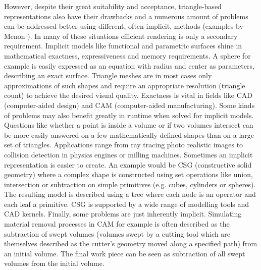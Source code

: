 However, despite their great suitability and acceptance, triangle-based representations also have their drawbacks and a numerous amount of problems can be addressed better using different, often implicit, methods (\cf examples by Menon \cite{implicit_techniques}). %
In many of these situations efficient rendering is only a secondary requirement.
Implicit models like functional and parametric surfaces shine in mathematical exactness, expressiveness and memory requirements.
A sphere for example is easily expressed as an equation with radius and center as parameters, describing an exact surface.
Triangle meshes are in most cases only approximations of such shapes and require an appropriate resolution (\ie triangle count) to achieve the desired visual quality.
Exactness is vital in fields like CAD (computer-aided design) and CAM (computer-aided manufacturing).
%
Some kinds of problems may also benefit greatly in runtime when solved for implicit models.
Questions like whether a point is inside a volume or if two volumes intersect can be more easily answered on a few mathematically defined shapes than on a large set of triangles.
Applications range from ray tracing photo realistic images to collision detection in physics engines or milling machines.
%
Sometimes an implicit representation is easier to create.
An example would be CSG (constructive solid geometry) where a complex shape is constructed using set operations like union, intersection or subtraction on simple primitives (e.g. cubes, cylinders or spheres).
The resulting model is described using a tree where each node is an operator and each leaf a primitive.
CSG is supported by a wide range of modelling tools and CAD kernels.
%
Finally, some problems are just inherently implicit.
Simulating material removal processes in CAM for example is often described as the subtraction of swept volumes (volumes swept by a cutting tool which are themselves described as the cutter's geometry moved along a specified path) from an initial volume.
The final work piece can be seen as subtraction of all swept volumes from the initial volume.


